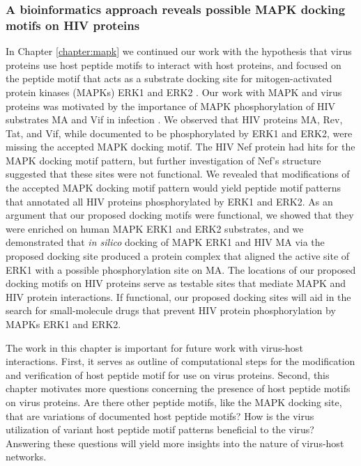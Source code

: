 
\subsubsection{A bioinformatics approach reveals possible MAPK docking motifs on HIV proteins}

In Chapter \ref{chapter:mapk} we continued our work with the
hypothesis that virus proteins use host peptide motifs to interact
with host proteins, and focused on the peptide motif that acts as a
substrate docking site for mitogen-activated protein kinases (MAPKs)
ERK1 and ERK2 \cite{bardwell09}. Our work with MAPK and virus proteins
was motivated by the importance of MAPK phosphorylation of HIV
substrates MA and Vif in infection \cite{yang99,bukrinskaya96}. We
observed that HIV proteins MA, Rev, Tat, and Vif, while documented to
be phosphorylated by ERK1 and ERK2, were missing the accepted MAPK
docking motif. The HIV Nef protein had hits for the MAPK docking motif
pattern, but further investigation of Nef's structure suggested that
these sites were not functional. We revealed that modifications of the
accepted MAPK docking motif pattern would yield peptide motif patterns
that annotated all HIV proteins phosphorylated by ERK1 and ERK2. As an
argument that our proposed docking motifs were functional, we showed
that they were enriched on human MAPK ERK1 and ERK2 substrates, and we
demonstrated that \textit{in silico} docking of MAPK ERK1 and HIV MA via the
proposed docking site produced a protein complex that aligned the
active site of ERK1 with a possible phosphorylation site on MA. The
locations of our proposed docking motifs on HIV proteins serve as
testable sites that mediate MAPK and HIV protein interactions. If
functional, our proposed docking sites will aid in the search for
small-molecule drugs that prevent HIV protein phosphorylation by MAPKs
ERK1 and ERK2.

The work in this chapter is important for future work with virus-host
interactions. First, it serves as outline of computational steps for
the modification and verification of host peptide motif for use on
virus proteins. Second, this chapter motivates more questions
concerning the presence of host peptide motifs on virus proteins. Are
there other peptide motifs, like the MAPK docking site, that are
variations of documented host peptide motifs? How is the virus
utilization of variant host peptide motif patterns beneficial to the
virus? Answering these questions will yield more insights into the
nature of virus-host networks.

